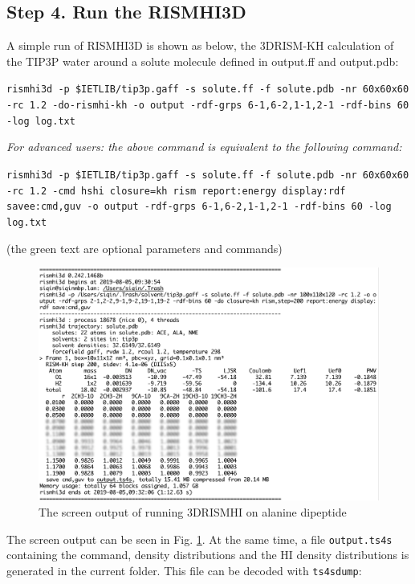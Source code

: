 \documentclass[aip,amsmath,amssymb,reprint,onecolumn]{revtex4-1}
\begin{document}
\subsection*{Step 4. Run the RISMHI3D}

A simple run of RISMHI3D is shown as below, the 3DRISM-KH calculation of the TIP3P water around a solute molecule defined in output.ff and output.pdb:

\texttt{\color{blue}\small rismhi3d -p \$IETLIB/tip3p.gaff -s solute.ff -f solute.pdb -nr 60x60x60 -rc 1.2 -do-rismhi-kh -o output -rdf-grps 6-1,6-2,1-1,2-1 -rdf-bins 60 -log log.txt}


{\it For advanced users: the above command is equivalent to the following command:}

\texttt{\color{blue}\small rismhi3d -p \$IETLIB/tip3p.gaff -s solute.ff -f solute.pdb -nr 60x60x60 -rc 1.2 -cmd hshi closure=kh rism report:energy display:rdf savee:cmd,guv -o output -rdf-grps 6-1,6-2,1-1,2-1 -rdf-bins 60 -log log.txt}

{\small(the green text are optional parameters and commands)}

\begin{figure}[!ht]
	\centering
	\includegraphics[width=0.7\linewidth]{rismhi3d-demo-screen.png}
	\caption{The screen output of running 3DRISMHI on alanine dipeptide}
	\label{fig:demo-screen}
\end{figure}

The screen output can be seen in Fig. \ref{fig:demo-screen}. At the same time, a file \texttt{output.ts4s} containing the command, density distributions and the HI density distributions is generated in the current folder. This file can be decoded with \texttt{ts4sdump}:
\end{document}
